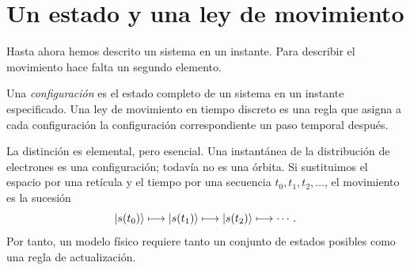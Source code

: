\begin{classroomqa}
\end{classroomqa}

\begin{classroomqa}
\end{classroomqa}

\section{Un estado y una ley de movimiento}

Hasta ahora hemos descrito un sistema en un instante. Para describir el movimiento hace falta un segundo elemento.

\begin{definition}Una \emph{configuración} es el estado completo de un sistema en un instante especificado. Una ley de movimiento en tiempo discreto es una regla que asigna a cada configuración la configuración correspondiente un paso temporal después.
\end{definition}

La distinción es elemental, pero esencial. Una instantánea de la distribución de electrones es una configuración; todavía no es una órbita. Si sustituimos el espacio por una retícula y el tiempo por una secuencia \(t_0,t_1,t_2,\ldots\), el movimiento es la sucesión
\begin{equation}
  \left\lvert s(t_0)\right\rangle
  \longmapsto
  \left\lvert s(t_1)\right\rangle
  \longmapsto
  \left\lvert s(t_2)\right\rangle
  \longmapsto\cdots.
  \label{eq:l01-discrete-motion}
\end{equation}
Por tanto, un modelo físico requiere tanto un conjunto de estados posibles como una regla de actualización.

